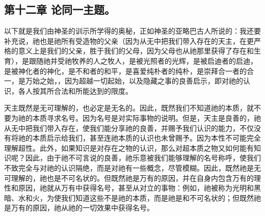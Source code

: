 
\subsection{第十二章 论同一主题。}

以下就是我们由神圣的训示所学得的奥秘，正如神圣的亚略巴古人所说的：我还要补充说，祂也是祂所有受造物的父亲（因为从无中把我们带入存在的天主，在更严格的意义上是我们的父亲，胜于我们的父母，因为父母也从祂那里获得了存在和生育），是跟随祂并受祂牧养的人之牧人，是被光照者的光辉，是被启迪者的启迪，是被神化者的神化，是不和者的和平，是喜爱纯朴者的纯朴，是崇拜合一者的合一，是万始之始，，因为超越一切起始，以及隐藏之事的良善启示，即对祂的认识，各人按其所合法和所能达到的限度。\par

\par

天主既然是无可理解的，也必定是无名的。因此，既然我们不知道祂的本质，就不要为祂的本质寻求名号。因为名号是对实际事物的说明。但是，天主是良善的，祂从无中把我们带入存在，使我们能分享祂的良善，并赐予我们认识的能力，不仅没有将祂的本质启示给我们，甚至连祂本质的认识也未曾赐予。因为本性不可能完全理解超性。此外，如果知识是对存在之物的认识，那么对超本质之物又如何能有知识呢？因此，由于祂不可言说的良善，祂乐意被我们能够理解的名号称呼，使我们不致完全与对祂的认识隔绝，而是对祂有一些概念，尽管模糊。因此，既然祂是无可理解的，祂也是不可名状的。但既然祂是万有的原因，并在自身内包含万有的理性和原因，祂就从万有中获得名号，甚至从对立的事物：例如，祂被称为光明和黑暗、水和火，为使我们知道这些不是祂的本质，而是祂是和不可名状的；但既然祂是万有的原因，祂从祂的一切效果中获得名号。\par


